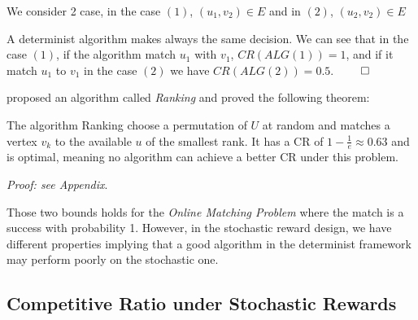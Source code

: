 \documentclass[12pt, twocolumn]{article}
\begin{document}
We consider 2 case, in the case $(1)$, $(u_1, v_2) \in E$ and in $(2)$, $(u_2, v_2) \in E$

A determinist algorithm makes always the same decision. We can see that in the case $(1)$, if the algorithm match $u_1$ with $v_1$, $CR(ALG(1))= 1$, and if it match $u_1$ to $v_1$ in the case $(2)$ we have $CR(ALG(2)) = 0.5$. $\qed$

\par
\hspace{\parindent}\cite{karp1990} proposed an algorithm called \textit{Ranking} and proved the following theorem:

\begin{theorem}\label{Theorem ranking}
    The algorithm Ranking choose a permutation of $U$ at random and matches a vertex $v_k$ to the available $u$ of the smallest rank. It has a CR of $1-\frac{1}{e} \approx 0.63$ and is optimal, meaning no algorithm can achieve a better CR under this problem.
\end{theorem}

\textit{Proof: see Appendix}.

\par
\hspace{\parindent}Those two bounds holds for the \textit{Online Matching Problem} where the match is a success with probability 1. However, in the stochastic reward design, we have different properties implying that a good algorithm in the determinist framework may perform poorly on the stochastic one.

\subsection{Competitive Ratio under Stochastic Rewards}
\end{document}
